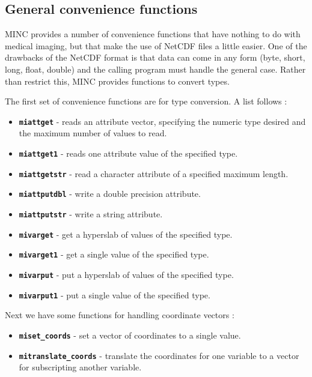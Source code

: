 \subsection{General convenience functions}

MINC provides a number of convenience functions that have nothing to
do with medical imaging, but that make the use of NetCDF files a
little easier. One of the drawbacks of the NetCDF format is that data
can come in any form (byte, short, long, float, double) and the
calling program must handle the general case. Rather than restrict
this, MINC provides functions to convert types.

The first set of convenience functions are for type conversion. A list
follows : 
\begin{itemize}
   \item {\bf \verb+miattget+} - reads an attribute vector, specifying
      the numeric type desired and the maximum number of values to read.
   \item {\bf \verb+miattget1+} - reads one attribute value of the
      specified type. 
   \item {\bf \verb+miattgetstr+} - read a character attribute of a specified
      maximum length.
   \item {\bf \verb+miattputdbl+} - write a double precision attribute.
   \item {\bf \verb+miattputstr+} - write a string attribute.
   \item {\bf \verb+mivarget+} - get a hyperslab of values of the
      specified type. 
   \item {\bf \verb+mivarget1+} - get a single value of the specified type.
   \item {\bf \verb+mivarput+} - put a hyperslab of values of the
      specified type. 
   \item {\bf \verb+mivarput1+} - put a single value of the specified type.
\end{itemize}

Next we have some functions for handling coordinate vectors :
\begin{itemize}
   \item {\bf \verb+miset_coords+} - set a vector of coordinates to a
      single value. 
   \item {\bf \verb+mitranslate_coords+} - translate the coordinates for one
      variable to a vector for subscripting another variable.
\end{itemize}

